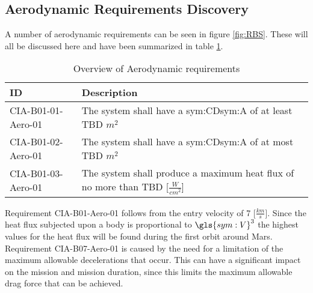 \subsection{Aerodynamic Requirements Discovery} 
\label{sec:aero}
A number of aerodynamic requirements can be seen in figure \ref{fig:RBS}. These will all be discussed here and have been summarized in table \ref{tab:aeroreqs}. 


\begin{table}[h]
	\caption{Overview of Aerodynamic requirements}
	\label{tab:aeroreqs}
	\begin{tabular}{|p{}|p{}|}
		\hline
		ID & Description \\
		\hline \hline
		CIA-B01-01-Aero-01 & The system shall have a \gls{sym:CD}\gls{sym:A} of at least TBD $m^{2}$ \\ \hline
		CIA-B01-02-Aero-01 & The system shall have a \gls{sym:CD}\gls{sym:A} of at most TBD $m^{2}$ \\ \hline
		CIA-B01-03-Aero-01 & The system shall produce a maximum heat flux of no more than TBD [$\frac{W}{cm^{2}}$] \\ \hline
	\end{tabular}
\end{table}

Requirement CIA-B01-Aero-01 follows from the entry velocity of 7 [$\frac{km}{s}$]. Since the heat flux subjected upon a body is proportional to $\gls{sym:V}^{3}$ \cite{Tauber1986} the highest values for the heat flux will be found during the first orbit around Mars. 
Requirement CIA-B07-Aero-01 is caused by the need for a limitation of the maximum allowable decelerations that occur. This can have a significant impact on the mission and mission duration, since this limits the maximum allowable drag force that can be achieved.